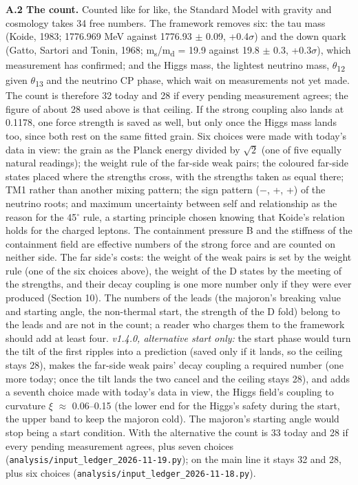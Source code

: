 \documentclass[
  11pt,
]{article}
\begin{document}
\textbf{A.2 The count.} Counted like for like, the Standard Model with gravity and cosmology takes 34 free numbers. The framework removes six: the tau mass (Koide, 1983; 1776.969 MeV against 1776.93 \ensuremath{\pm} 0.09, +0.4\ensuremath{\sigma}) and the down quark (Gatto, Sartori and Tonin, 1968; m\textsubscript{s}/m\textsubscript{d} = 19.9 against 19.8 \ensuremath{\pm} 0.3, +0.3\ensuremath{\sigma}), which measurement has confirmed; and the Higgs mass, the lightest neutrino mass, \ensuremath{\theta}\textsubscript{12} given \ensuremath{\theta}\textsubscript{13} and the neutrino CP phase, which wait on measurements not yet made. The count is therefore 32 today and 28 if every pending measurement agrees; the figure of about 28 used above is that ceiling. If the strong coupling also lands at 0.1178, one force strength is saved as well, but only once the Higgs mass lands too, since both rest on the same fitted grain. Six choices were made with today's data in view: the grain as the Planck energy divided by \ensuremath{\sqrt{2}} (one of five equally natural readings); the weight rule of the far-side weak pairs; the coloured far-side states placed where the strengths cross, with the strengths taken as equal there; TM1 rather than another mixing pattern; the sign pattern (\ensuremath{-}, +, +) of the neutrino roots; and maximum uncertainty between self and relationship as the reason for the 45\ensuremath{^\circ} rule, a starting principle chosen knowing that Koide's relation holds for the charged leptons. The containment pressure B and the stiffness of the containment field are effective numbers of the strong force and are counted on neither side. The far side's costs: the weight of the weak pairs is set by the weight rule (one of the six choices above), the weight of the D states by the meeting of the strengths, and their decay coupling is one more number only if they were ever produced (Section 10). The numbers of the leads (the majoron's breaking value and starting angle, the non-thermal start, the strength of the D fold) belong to the leads and are not in the count; a reader who charges them to the framework should add at least four. \emph{v1.4.0, alternative start only:} the start phase would turn the tilt of the first ripples into a prediction (saved only if it lands, so the ceiling stays 28), makes the far-side weak pairs' decay coupling a required number (one more today; once the tilt lands the two cancel and the ceiling stays 28), and adds a seventh choice made with today's data in view, the Higgs field's coupling to curvature \ensuremath{\xi} \ensuremath{\approx} 0.06--0.15 (the lower end for the Higgs's safety during the start, the upper band to keep the majoron cold). The majoron's starting angle would stop being a start condition. With the alternative the count is 33 today and 28 if every pending measurement agrees, plus seven choices (\texttt{analysis/input\_ledger\_2026-11-19.py}); on the main line it stays 32 and 28, plus six choices (\texttt{analysis/input\_ledger\_2026-11-18.py}).
\end{document}

